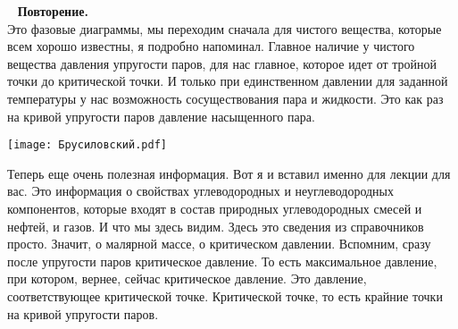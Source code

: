 \documentclass[main.tex]{subfiles}
\begin{document}
\ \newline
\textbf{Повторение.}\\
Это фазовые диаграммы, мы переходим сначала для чистого вещества, которые всем хорошо известны, я подробно напоминал.
Главное наличие у чистого вещества давления упругости паров, для нас главное, которое идет от тройной точки до критической точки.
И только при единственном давлении для заданной температуры у нас возможность сосуществования пара и жидкости.
Это как раз на кривой упругости паров давление насыщенного пара.

\begin{center}
\texttt{[image: Брусиловский.pdf]}
\end{center}

Теперь еще очень полезная информация.
Вот я и вставил именно для лекции для вас.
Это информация о свойствах углеводородных и неуглеводородных компонентов, которые входят в состав природных углеводородных смесей и нефтей, и газов.
И что мы здесь видим.
Здесь это сведения из справочников просто.
Значит, о малярной массе, о критическом давлении.
Вспомним, сразу после упругости паров критическое давление.
То есть максимальное давление, при котором, вернее, сейчас
критическое давление.
Это давление, соответствующее критической точке.
Критической точке, то есть крайние точки на кривой упругости паров.
\end{document}
